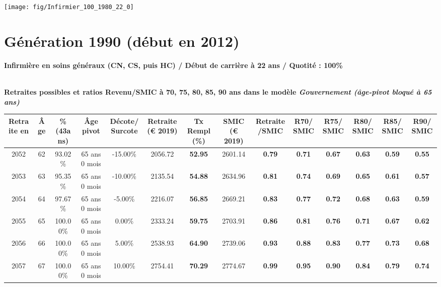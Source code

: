  {\hspace{-2.2cm}\texttt{[image: fig/Infirmier\_100\_1980\_22\_0]}} 

\newpage 
 
\section{Génération 1990 (début en 2012)\label{Infirmier_100_1990_22_0}} 
 
{\bf \noindent Infirmière en soins généraux (CN, CS, puis HC) / Début de carrière à 22 ans / Quotité : 100\%}  ~ 

 ~\\{\bf \noindent Retraites possibles et ratios Revenu/SMIC à 70, 75, 80, 85, 90 ans dans le modèle \emph{Gouvernement (âge-pivot bloqué à 65 ans)}}  
 
\begin{adjustbox}{max width=\textwidth} 
\begin{tabular}[htb]{|c|c||c|c|c||c|c||c|c||c|c|c|c|c|} 
\hline 
 Retraite en &  Âge &  \%(43ans) &  Âge pivot &  Décote/Surcote &  Retraite (\euro{} 2019) &  Tx Rempl(\%) &  SMIC (\euro{} 2019) &  Retraite/SMIC &  R70/SMIC &  R75/SMIC &  R80/SMIC &  R85/SMIC &  R90/SMIC \\ 
\hline \hline 
 2052 &  62 &  93.02\% &  65 ans 0 mois &  -15.00\% &  2056.72 &  {\bf 52.95} &  2601.14 &  {\bf {\color{red} 0.79}} &  {\bf {\color{red} 0.71}} &  {\bf {\color{red} 0.67}} &  {\bf {\color{red} 0.63}} &  {\bf {\color{red} 0.59}} &  {\bf {\color{red} 0.55}} \\ 
\hline 
 2053 &  63 &  95.35\% &  65 ans 0 mois &  -10.00\% &  2135.54 &  {\bf 54.88} &  2634.96 &  {\bf {\color{red} 0.81}} &  {\bf {\color{red} 0.74}} &  {\bf {\color{red} 0.69}} &  {\bf {\color{red} 0.65}} &  {\bf {\color{red} 0.61}} &  {\bf {\color{red} 0.57}} \\ 
\hline 
 2054 &  64 &  97.67\% &  65 ans 0 mois &  -5.00\% &  2216.07 &  {\bf 56.85} &  2669.21 &  {\bf {\color{red} 0.83}} &  {\bf {\color{red} 0.77}} &  {\bf {\color{red} 0.72}} &  {\bf {\color{red} 0.68}} &  {\bf {\color{red} 0.63}} &  {\bf {\color{red} 0.59}} \\ 
\hline 
 2055 &  65 &  100.00\% &  65 ans 0 mois &  0.00\% &  2333.24 &  {\bf 59.75} &  2703.91 &  {\bf {\color{red} 0.86}} &  {\bf {\color{red} 0.81}} &  {\bf {\color{red} 0.76}} &  {\bf {\color{red} 0.71}} &  {\bf {\color{red} 0.67}} &  {\bf {\color{red} 0.62}} \\ 
\hline 
 2056 &  66 &  100.00\% &  65 ans 0 mois &  5.00\% &  2538.93 &  {\bf 64.90} &  2739.06 &  {\bf {\color{red} 0.93}} &  {\bf {\color{red} 0.88}} &  {\bf {\color{red} 0.83}} &  {\bf {\color{red} 0.77}} &  {\bf {\color{red} 0.73}} &  {\bf {\color{red} 0.68}} \\ 
\hline 
 2057 &  67 &  100.00\% &  65 ans 0 mois &  10.00\% &  2754.41 &  {\bf 70.29} &  2774.67 &  {\bf {\color{red} 0.99}} &  {\bf {\color{red} 0.95}} &  {\bf {\color{red} 0.90}} &  {\bf {\color{red} 0.84}} &  {\bf {\color{red} 0.79}} &  {\bf {\color{red} 0.74}} \\ 
\hline 
\hline 
\end{tabular} 
\end{adjustbox} 
 
